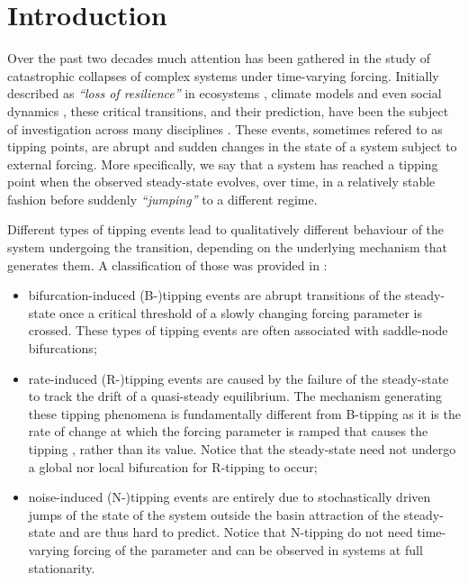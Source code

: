 \documentclass[a4paper,fleqn]{cas-sc}
\begin{document}
\section{Introduction}
Over the past two decades much attention has been gathered in the study of catastrophic collapses of complex systems under time-varying forcing.
Initially described as \textit{``loss of resilience''} in ecosystems \cite{Ives1995, Scheffer2009}, climate models \cite{Lenton2012} and even social dynamics \cite{Scheffer2021}, these critical transitions, and their prediction, have been the subject of investigation across many disciplines \cite{Feng2014,Liang2017,Xu2023}.
These events, sometimes refered to as tipping points, are abrupt and sudden changes in the state of a system subject to external forcing.
More specifically, we say that a system has reached a tipping point when the observed steady-state evolves, over time, in a relatively stable fashion before suddenly \textit{``jumping''} to a different regime.

Different types of tipping events lead to qualitatively different behaviour of the system undergoing the transition, depending on the underlying mechanism that generates them. 
A classification of those was provided in \cite{Ashwin2012}:
%
\begin{itemize}
        \item bifurcation-induced (B-)tipping events are abrupt transitions of the steady-state once a critical threshold of a slowly changing forcing parameter is crossed. These types of tipping events are often associated with saddle-node bifurcations;
     \item rate-induced (R-)tipping events are caused by the failure of the steady-state to track the drift of a quasi-steady equilibrium. The mechanism generating these tipping phenomena is fundamentally different from B-tipping as it is the rate of change at which the forcing parameter is ramped that causes the tipping \cite{Ashwin2017}, rather than its value. Notice that the steady-state need not undergo a global nor local bifurcation for R-tipping to occur;
     \item noise-induced (N-)tipping events are entirely due to stochastically driven jumps of the state of the system outside the basin attraction of the steady-state and are thus hard to predict. Notice that N-tipping do not need time-varying forcing of the parameter and can be observed in systems at full stationarity.
\end{itemize}
\end{document}
